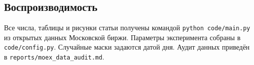 \documentclass{article}
\begin{document}
\subsection{Воспроизводимость}

Все числа, таблицы и рисунки статьи получены командой \texttt{python code/main.py} из открытых данных Московской биржи. Параметры эксперимента собраны в \texttt{code/config.py}. Случайные маски задаются датой дня. Аудит данных приведён в \texttt{reports/moex\_data\_audit.md}.
\end{document}
